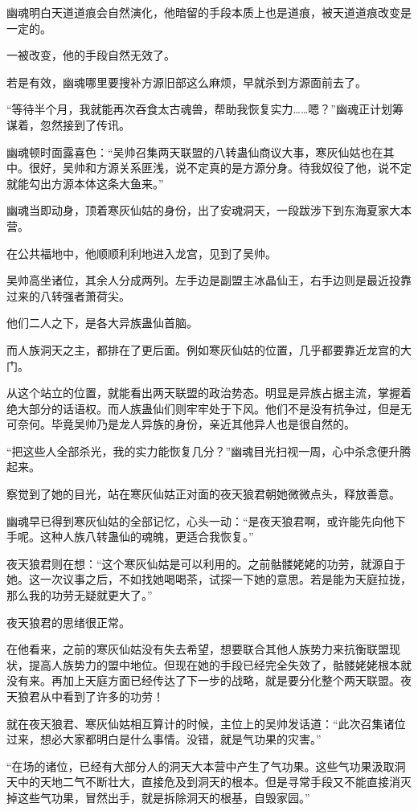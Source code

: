 \begin{this_body}
幽魂明白天道道痕会自然演化，他暗留的手段本质上也是道痕，被天道道痕改变是一定的。

一被改变，他的手段自然无效了。

若是有效，幽魂哪里要搜补方源旧部这么麻烦，早就杀到方源面前去了。

“等待半个月，我就能再次吞食太古魂兽，帮助我恢复实力……嗯？”幽魂正计划筹谋着，忽然接到了传讯。

幽魂顿时面露喜色：“吴帅召集两天联盟的八转蛊仙商议大事，寒灰仙姑也在其中。很好，吴帅和方源关系匪浅，说不定真的是方源分身。待我奴役了他，说不定就能勾出方源本体这条大鱼来。”

幽魂当即动身，顶着寒灰仙姑的身份，出了安魂洞天，一段跋涉下到东海夏家大本营。

在公共福地中，他顺顺利利地进入龙宫，见到了吴帅。

吴帅高坐诸位，其余人分成两列。左手边是副盟主冰晶仙王，右手边则是最近投靠过来的八转强者萧荷尖。

他们二人之下，是各大异族蛊仙首脑。

而人族洞天之主，都排在了更后面。例如寒灰仙姑的位置，几乎都要靠近龙宫的大门。

从这个站立的位置，就能看出两天联盟的政治势态。明显是异族占据主流，掌握着绝大部分的话语权。而人族蛊仙们则牢牢处于下风。他们不是没有抗争过，但是无可奈何。毕竟吴帅乃是龙人异族的身份，亲近其他异人也是很自然的。

“把这些人全部杀光，我的实力能恢复几分？”幽魂目光扫视一周，心中杀念便升腾起来。

察觉到了她的目光，站在寒灰仙姑正对面的夜天狼君朝她微微点头，释放善意。

幽魂早已得到寒灰仙姑的全部记忆，心头一动：“是夜天狼君啊，或许能先向他下手呢。这种人族八转蛊仙的魂魄，更适合我恢复。”

夜天狼君则在想：“这个寒灰仙姑是可以利用的。之前骷髅姥姥的功劳，就源自于她。这一次议事之后，不如找她喝喝茶，试探一下她的意思。若是能为天庭拉拢，那么我的功劳无疑就更大了。”

夜天狼君的思绪很正常。

在他看来，之前的寒灰仙姑没有失去希望，想要联合其他人族势力来抗衡联盟现状，提高人族势力的盟中地位。但现在她的手段已经完全失效了，骷髅姥姥根本就没有来。再加上天庭方面已经传达了下一步的战略，就是要分化整个两天联盟。夜天狼君从中看到了许多的功劳！

就在夜天狼君、寒灰仙姑相互算计的时候，主位上的吴帅发话道：“此次召集诸位过来，想必大家都明白是什么事情。没错，就是气功果的灾害。”

“在场的诸位，已经有大部分人的洞天大本营中产生了气功果。这些气功果汲取洞天中的天地二气不断壮大，直接危及到洞天的根本。但是寻常手段又不能直接消灭掉这些气功果，冒然出手，就是拆除洞天的根基，自毁家园。”


\end{this_body}
